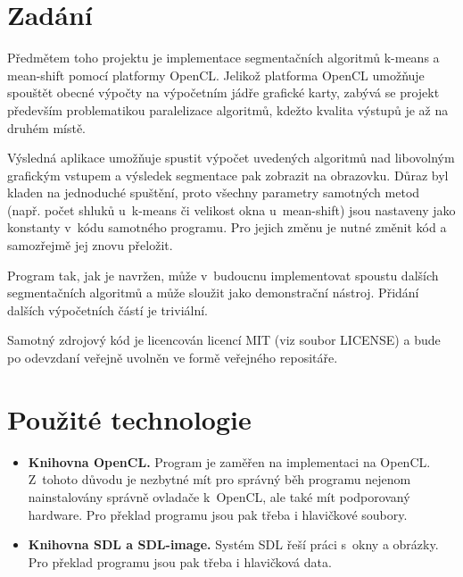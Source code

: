 \documentclass[11pt,a4paper]{article}
\begin{document}
\titlepageandcontents

\section{Zadání}

Předmětem toho projektu je implementace segmentačních algoritmů k-means a mean-shift pomocí platformy OpenCL. Jelikož platforma OpenCL umožňuje spouštět obecné výpočty na výpočetním jádře grafické karty, zabývá se projekt především problematikou paralelizace algoritmů, kdežto kvalita výstupů je až na druhém místě.

Výsledná aplikace umožňuje spustit výpočet uvedených algoritmů nad libovolným grafickým vstupem a výsledek segmentace pak zobrazit na obrazovku. Důraz byl kladen na jednoduché spuštění, proto všechny parametry samotných metod (např. počet shluků u~k-means či velikost okna u~mean-shift) jsou nastaveny jako konstanty v~kódu samotného programu. Pro jejich změnu je nutné změnit kód a samozřejmě jej znovu přeložit.

Program tak, jak je navržen, může v~budoucnu implementovat spoustu dalších segmentačních algoritmů a může sloužit jako demonstrační nástroj. Přidání dalších výpočetních částí je triviální.

Samotný zdrojový kód je licencován licencí MIT (viz soubor LICENSE) a bude po odevzdaní veřejně uvolněn ve formě veřejného repositáře.

\section{Použité technologie}
\begin{itemize}
  \item \textbf{Knihovna OpenCL.} Program je zaměřen na implementaci na OpenCL. Z~tohoto důvodu je nezbytné mít pro správný běh programu nejenom nainstalovány správně ovladače k~OpenCL, ale také mít podporovaný hardware. Pro překlad programu jsou pak třeba i hlavičkové soubory.
  \item \textbf{Knihovna SDL a SDL-image.} Systém SDL řeší práci s~okny a obrázky. Pro překlad programu jsou pak třeba i hlavičková data.
\end{itemize}


\end{document}
